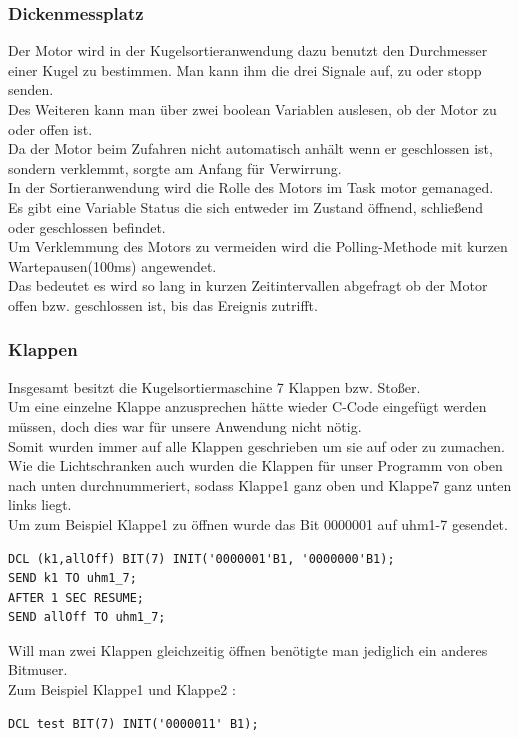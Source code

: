 \subsubsection{Dickenmessplatz}
Der Motor wird in der Kugelsortieranwendung dazu benutzt den Durchmesser einer Kugel zu bestimmen. Man kann ihm die drei Signale auf, zu oder stopp senden.\\
Des Weiteren kann man über zwei boolean Variablen auslesen, ob der Motor zu oder offen ist.\\
Da der Motor beim Zufahren nicht automatisch anhält wenn er geschlossen ist, sondern verklemmt, sorgte am Anfang für Verwirrung.\\
In der Sortieranwendung wird die Rolle des Motors im Task motor gemanaged.\\
Es gibt eine Variable Status die sich entweder im Zustand öffnend, schließend oder geschlossen befindet.\\
Um Verklemmung des Motors zu vermeiden wird die Polling-Methode mit kurzen Wartepausen(100ms) angewendet.\\
Das bedeutet es wird so lang in kurzen Zeitintervallen abgefragt ob der Motor offen bzw. geschlossen ist, bis das Ereignis zutrifft.\\
\newpage

\subsubsection{Klappen}
Insgesamt besitzt die Kugelsortiermaschine 7 Klappen bzw. Stoßer.\\
Um eine einzelne Klappe anzusprechen hätte wieder C-Code eingefügt werden müssen, doch dies war für unsere Anwendung nicht nötig.\\
Somit wurden immer auf alle Klappen geschrieben um sie auf oder zu zumachen.\\ 
Wie die Lichtschranken auch wurden die Klappen für unser Programm von oben nach unten durchnummeriert, sodass Klappe1 ganz oben und Klappe7 ganz unten links liegt.\\
Um zum Beispiel Klappe1 zu öffnen wurde das Bit 0000001 auf uhm1-7 gesendet.\\
\begin{lstlisting}
DCL (k1,allOff) BIT(7) INIT('0000001'B1, '0000000'B1);
SEND k1 TO uhm1_7;
AFTER 1 SEC RESUME;
SEND allOff TO uhm1_7;
\end{lstlisting}
Will man zwei Klappen gleichzeitig öffnen benötigte man jediglich ein anderes Bitmuser.\\
Zum Beispiel Klappe1 und Klappe2 :
\begin{lstlisting}
DCL test BIT(7) INIT('0000011' B1);
\end{lstlisting}
